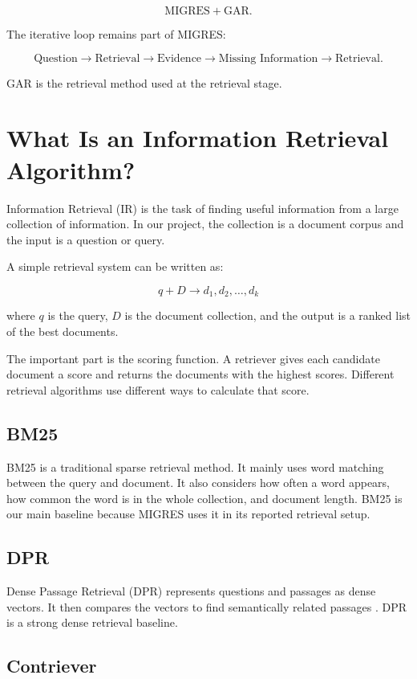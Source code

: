 \documentclass[11pt,a4paper]{article}
\begin{document}
\[
\text{MIGRES}+\text{GAR}.
\]

The iterative loop remains part of MIGRES:

\[
\text{Question}
\rightarrow
\text{Retrieval}
\rightarrow
\text{Evidence}
\rightarrow
\text{Missing Information}
\rightarrow
\text{Retrieval}.
\]

GAR is the retrieval method used at the retrieval stage.


\section{What Is an Information Retrieval Algorithm?}

Information Retrieval (IR) is the task of finding useful information from a large collection of information. In our project, the collection is a document corpus and the input is a question or query.

A simple retrieval system can be written as:

\[
q + D \longrightarrow d_1,d_2,\ldots,d_k
\]

where $q$ is the query, $D$ is the document collection, and the output is a ranked list of the best documents.

The important part is the scoring function. A retriever gives each candidate document a score and returns the documents with the highest scores. Different retrieval algorithms use different ways to calculate that score.

\subsection{BM25}

BM25 is a traditional sparse retrieval method. It mainly uses word matching between the query and document. It also considers how often a word appears, how common the word is in the whole collection, and document length. BM25 is our main baseline because MIGRES uses it in its reported retrieval setup.

\subsection{DPR}

Dense Passage Retrieval (DPR) represents questions and passages as dense vectors. It then compares the vectors to find semantically related passages \cite{dpr}. DPR is a strong dense retrieval baseline.

\subsection{Contriever}
\end{document}
